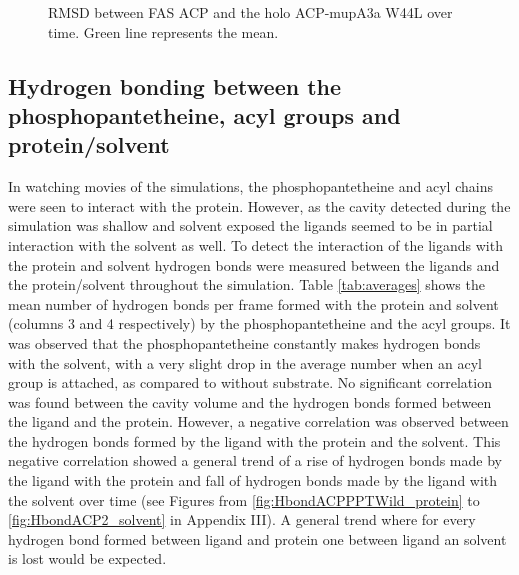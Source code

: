 		\setlength\fboxsep{5pt}
		\setlength\fboxrule{1.5pt}
		\begin{figure}[htbp]
		\centering
		\caption[RMSD between FAS ACP and the holo ACP-mupA3a W44L over time.]{RMSD between FAS ACP and the holo ACP-mupA3a W44L over time. Green line represents the mean.}
		\label{fig:RmsdAcpPPTMutant1}
		\end{figure}	
	
	\subsection{Hydrogen bonding between the phosphopantetheine, acyl groups and protein/solvent}
	\label{sec:hb}
	In watching movies of the simulations, the phosphopantetheine and acyl chains were seen to interact with the protein. However, as the cavity detected during the simulation was shallow and solvent exposed the ligands seemed to be in partial interaction with the solvent as well. To detect the interaction of the ligands with the protein and solvent hydrogen bonds were measured between the ligands and the protein/solvent throughout the simulation. Table \ref{tab:averages} shows the mean number of hydrogen bonds per frame formed with the protein and solvent (columns 3 and 4 respectively) by the phosphopantetheine and the acyl groups. It was observed that the phosphopantetheine constantly makes hydrogen bonds with the solvent, with a very slight drop in the average number when an acyl group is attached, as compared to without substrate. No significant correlation was found between the cavity volume and the hydrogen bonds formed between the ligand and the protein. However, a negative correlation was observed between the hydrogen bonds formed by the ligand with the protein and the solvent. This negative correlation showed a general trend of a rise of hydrogen bonds made by the ligand with the protein and fall of hydrogen bonds made by the ligand with the solvent over time (see Figures from \ref{fig:HbondACPPPTWild_protein} to \ref{fig:HbondACP2_solvent} in Appendix III). A general trend where for every hydrogen bond formed between ligand and protein one between ligand an solvent is lost would be expected.

